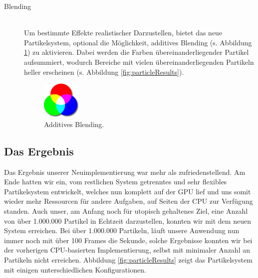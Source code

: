 \begin{Spacing}{\mylinespace}
\begin{description}
	\item[Blending] \hfill \\
Um bestimmte Effekte realistischer Darzustellen, bietet das neue Partikelsystem, optional die Möglichkeit, additives Blending (s. Abbildung \ref{fig:addBlending}) zu aktivieren. Dabei werden die Farben übereinanderliegender Partikel aufsummiert, wodurch Bereiche mit vielen übereinanderliegenden Partikeln heller erscheinen (s. Abbildung \ref{fig:particleResults}).

\begin{figure}[h!]
	\centering
	\vspace*{0px}
	\includegraphics[width=70px]{graphics/additiveBlending.png}
	\caption{Additives Blending.}
	\label{fig:addBlending}
\end{figure}

\end{description}

\newpage
\subsection{Das Ergebnis}

Das Ergebnis unserer Neuimplementierung war mehr als zufriedenstellend. Am Ende hatten wir ein, vom restlichen System getrenntes und sehr flexibles Partikelsystem entwickelt, welches nun komplett auf der GPU lief und uns somit wieder mehr Ressourcen für andere Aufgaben, auf Seiten der CPU zur Verfügung standen. Auch unser, am Anfang noch für utopisch gehaltenes Ziel, eine Anzahl von über 1.000.000 Partikel in Echtzeit darzustellen, konnten wir mit dem neuen System erreichen. Bei über 1.000.000 Partikeln, läuft unsere Anwendung nun immer noch mit über 100 Frames die Sekunde, solche Ergebnisse konnten wir bei der vorherigen CPU-basierten Implementierung, selbst mit minimaler Anzahl an Partikeln nicht erreichen. Abbildung \ref{fig:particleResults} zeigt das Partikelsystem mit einigen unterschiedlichen Konfigurationen.


\end{Spacing}
